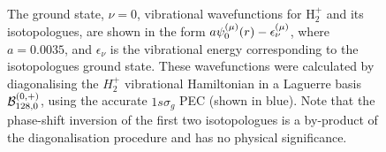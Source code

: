 \documentclass[draft]{article}
\begin{document}
\begin{figure}[h]
  \caption
  {
    The ground state, $\nu = 0$, vibrational wavefunctions for
    $\mathrm{H}_{2}^{+}$ and its isotopologues, are shown in the form
    $a\psi_{0}^{(\mu)}(r) - \epsilon_{\nu}^{(\mu)}$, where
    $a = 0.0035$, and $\epsilon_{\nu}$ is the vibrational energy corresponding
    to the isotopologues ground state.
    These wavefunctions were calculated by diagonalising the $H_{2}^{+}$
    vibrational Hamiltonian in a Laguerre basis
    $\mathcal{B}_{128, 0}^{(0, +)}$, using the accurate $1s\sigma_{g}$ PEC
    (shown in blue).
    Note that the phase-shift inversion of the first two isotopologues is a
    by-product of the diagonalisation procedure and has no physical
    significance.
  }
  \label{fig:vib-1ssg-isotopologue}
\end{figure}
\end{document}
